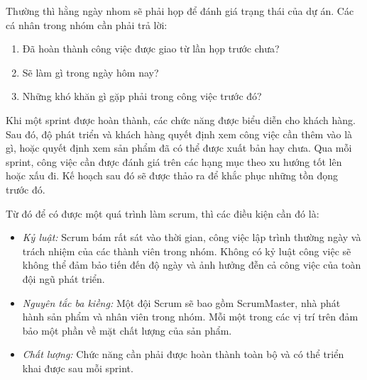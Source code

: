 \documentclass{article}
\begin{document}
Thường thì hằng ngày nhom sẽ phải họp để đánh giá trạng thái của dự án. Các cá nhân trong nhóm cần phải trả lời:
\begin{enumerate}
	\item Đã hoàn thành công việc được giao từ lần họp trước chưa?
	\item Sẽ làm gì trong ngày hôm nay?
	\item Những khó khăn gì gặp phải trong công việc trước đó?
	\end{enumerate}
	
	Khi một sprint được hoàn thành, các chức năng được biểu diễn cho khách hàng. Sau đó, độ phát triển và khách hàng quyết định xem công việc cần thêm vào là gì, hoặc quyết định xem sản phẩm đã có thể được xuất bản hay chưa. Qua mỗi sprint, công việc cần được đánh giá trên các hạng mục theo xu hướng tốt lên hoặc xấu đi. Kế hoạch sau đó sẽ được thảo ra để khắc phục những tồn đọng trước đó. 
	
	Từ đó để có được một quá trình làm scrum, thì các điều kiện cần đó là:
	\begin{itemize}
		
		\item \textit{Kỷ luật:} Scrum bám rất sát vào thời gian, công việc lập trình thường ngày và trách nhiệm của các thành viên trong nhóm. Không có kỷ luật công việc sẽ không thể đảm bảo tiến đến độ ngày và ảnh hưởng đễn cả công việc của toàn đội ngũ phát triển. 
		
		\item \textit{Nguyên tắc ba kiềng:} Một đội Scrum sẽ bao gồm ScrumMaster, nhà phát hành sản phẩm và nhân viên trong nhóm. Mỗi một trong các vị trí trên đảm bảo một phần về mặt chất lượng của sản phẩm. 
		
		\item \textit{Chất lượng:} Chức năng cần phải được hoàn thành toàn bộ và có thể triển khai được sau mỗi sprint. 
		\end{itemize}
\end{document}
